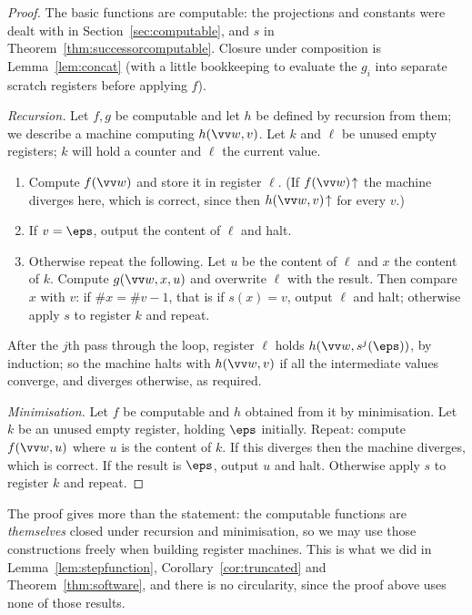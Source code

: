 \begin{proof}
	The basic functions are computable: the projections and constants were dealt with in Section~\ref{sec:computable}, and $s$ in Theorem~\ref{thm:successorcomputable}. Closure under composition is Lemma~\ref{lem:concat} (with a little bookkeeping to evaluate the $g_i$ into separate scratch registers before applying $f$).

	\emph{Recursion.} Let $f,g$ be computable and let $h$ be defined by recursion from them; we describe a machine computing $h(\vv w, v)$. Let $k$ and $\ell$ be unused empty registers; $k$ will hold a counter and $\ell$ the current value.
	\begin{enumerate}[label=(\roman*)]
		\item Compute $f(\vv w)$ and store it in register $\ell$. (If $f(\vv w)\!\uparrow$ the machine diverges here, which is correct, since then $h(\vv w, v)\!\uparrow$ for every $v$.)
		\item If $v = \eps$, output the content of $\ell$ and halt.
		\item Otherwise repeat the following. Let $u$ be the content of $\ell$ and $x$ the content of $k$. Compute $g(\vv w, x, u)$ and overwrite $\ell$ with the result. Then compare $x$ with $v$: if $\#x = \#v - 1$, that is if $s(x) = v$, output $\ell$ and halt; otherwise apply $s$ to register $k$ and repeat.
	\end{enumerate}
	After the $j$th pass through the loop, register $\ell$ holds $h(\vv w, s^j(\eps))$, by induction; so the machine halts with $h(\vv w, v)$ if all the intermediate values converge, and diverges otherwise, as required.

	\emph{Minimisation.} Let $f$ be computable and $h$ obtained from it by minimisation. Let $k$ be an unused empty register, holding $\eps$ initially. Repeat: compute $f(\vv w, u)$ where $u$ is the content of $k$. If this diverges then the machine diverges, which is correct. If the result is $\eps$, output $u$ and halt. Otherwise apply $s$ to register $k$ and repeat.
\end{proof}

\begin{remark}
	The proof gives more than the statement: the computable functions are \emph{themselves} closed under recursion and minimisation, so we may use those constructions freely when building register machines. This is what we did in Lemma~\ref{lem:stepfunction}, Corollary~\ref{cor:truncated} and Theorem~\ref{thm:software}, and there is no circularity, since the proof above uses none of those results.
\end{remark}

